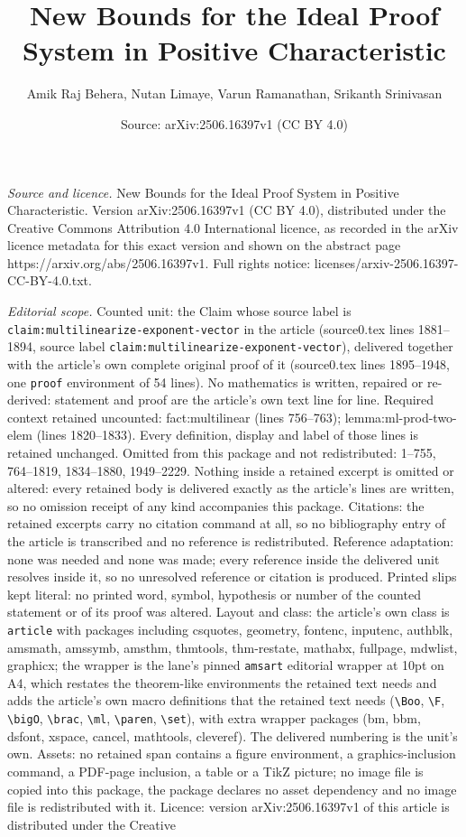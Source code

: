 \documentclass[10pt,a4paper]{amsart}
\title[New Bounds for the Ideal Proof System in Positive Characteri]{New Bounds for the Ideal Proof System in Positive Characteristic}
\author{Amik Raj Behera, Nutan Limaye, Varun Ramanathan, Srikanth Srinivasan}
\date{Source: arXiv:2506.16397v1 (CC BY 4.0)}
\begin{document}
\maketitle

\noindent\emph{Source and licence.} New Bounds for the Ideal Proof System in Positive Characteristic. Version arXiv:2506.16397v1 (CC BY 4.0), distributed under the Creative Commons Attribution 4.0 International licence, as recorded in the arXiv licence metadata for this exact version and shown on the abstract page https://arxiv.org/abs/2506.16397v1. Full rights notice: licenses/arxiv-2506.16397-CC-BY-4.0.txt.\par\smallskip

\noindent\textit{Editorial scope.} Counted unit: the Claim whose source label is \texttt{claim:multilinearize-exponent-vector} in the article (source0.tex lines 1881--1894, source label \texttt{claim:multilinearize-exponent-vector}), delivered together with the article's own complete original proof of it (source0.tex lines 1895--1948, one \texttt{proof} environment of 54 lines). No mathematics is written, repaired or re-derived: statement and proof are the article's own text line for line. Required context retained uncounted: fact:multilinear (lines 756--763); lemma:ml-prod-two-elem (lines 1820--1833). Every definition, display and label of those lines is retained unchanged. Omitted from this package and not redistributed: 1--755, 764--1819, 1834--1880, 1949--2229. Nothing inside a retained excerpt is omitted or altered: every retained body is delivered exactly as the article's lines are written, so no omission receipt of any kind accompanies this package. Citations: the retained excerpts carry no citation command at all, so no bibliography entry of the article is transcribed and no reference is redistributed. Reference adaptation: none was needed and none was made; every reference inside the delivered unit resolves inside it, so no unresolved reference or citation is produced. Printed slips kept literal: no printed word, symbol, hypothesis or number of the counted statement or of its proof was altered. Layout and class: the article's own class is \texttt{article} with packages including csquotes, geometry, fontenc, inputenc, authblk, amsmath, amssymb, amsthm, thmtools, thm-restate, mathabx, fullpage, mdwlist, graphicx; the wrapper is the lane's pinned \texttt{amsart} editorial wrapper at 10pt on A4, which restates the theorem-like environments the retained text needs and adds the article's own macro definitions that the retained text needs (\texttt{\textbackslash Boo}, \texttt{\textbackslash F}, \texttt{\textbackslash bigO}, \texttt{\textbackslash brac}, \texttt{\textbackslash ml}, \texttt{\textbackslash paren}, \texttt{\textbackslash set}), with extra wrapper packages (bm, bbm, dsfont, xspace, cancel, mathtools, cleveref). The delivered numbering is the unit's own. Assets: no retained span contains a figure environment, a graphics-inclusion command, a PDF-page inclusion, a table or a TikZ picture; no image file is copied into this package, the package declares no asset dependency and no image file is redistributed with it. Licence: version arXiv:2506.16397v1 of this article is distributed under the Creative 
\end{document}
